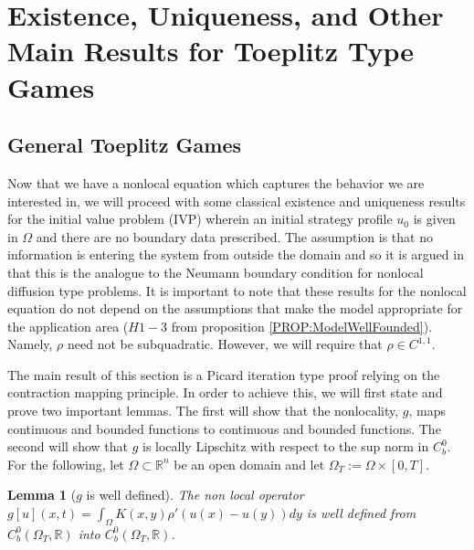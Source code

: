 \documentclass[aps,
preprint,
groupedaddress,
showkeys,
amsmath]{revtex4-2}
\newtheorem{lemma}{Lemma}
\begin{document}
\section{Existence, Uniqueness, and Other Main Results for Toeplitz Type Games}\label{SEC:ExistenceUniquenessAndMainResults}
\subsection{General Toeplitz Games}\label{SUBSEC:GeneralToeplitzGames}
 Now that we have a nonlocal equation which captures the behavior we are interested in, we will proceed with some classical existence and uniqueness results for the initial value problem (IVP) wherein an initial strategy profile $u_0$ is given in $\Omega$ and there are no boundary data prescribed. The assumption is that no information is entering the system from outside the domain and so it is argued in \cite{CHASSEIGNE2006} that this is the analogue to the Neumann boundary condition for nonlocal diffusion type problems. It is important to note that these results for the nonlocal equation do not depend on the assumptions that make the model appropriate for the application area ($H1-3$ from proposition \ref{PROP:ModelWellFounded}). Namely, $\rho$ need not be subquadratic. However, we will require that $\rho\in C^{1,1}$. 
 
 The main result of this section is a Picard iteration type proof relying on the contraction mapping principle. In order to achieve this, we will first state and prove two important lemmas. The first will show that the nonlocality, $g$, maps continuous and  bounded functions to continuous and bounded functions. The second will show that $g$ is locally Lipschitz with respect to the sup norm in $C^0_b$. For the following, let $\Omega\subset \mathbb{R}^n$ be an open domain and let $\Omega_T:=\Omega\times [0,T]$. 

  \begin{lemma}[$g$ is well defined]\label{LEM:welldefined}
        The non local operator $g[u](x,t)=\int_\Omega K(x,y)\rho'(u(x)-u(y))dy$ is well defined from $C^0_b(\Omega_T,\mathbb{R})$ into $C^0_b(\Omega_T,\mathbb{R})$.
    \end{lemma}
\end{document}

